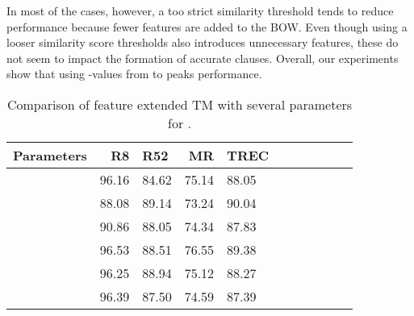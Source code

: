 \documentclass[11pt]{article}
\begin{document}
\par In most of the cases, however, a too strict similarity threshold  tends to reduce performance because fewer features are added to the BOW. Even though using a looser similarity score thresholds also introduces unnecessary features, these do not seem to impact the formation of accurate clauses. Overall, our experiments show that using -values from  to  peaks performance.



\begin{comment}

\begin{figure}[h]
    \centering
    \texttt{[image: Figures/R8CS.pdf]}
    \caption{Epoch-wise test accuracy based on various -values for R8.}
    \label{fig10}
\end{figure}

\begin{figure}[h]
    \centering
    \texttt{[image: Figures/R52CS.pdf]}
    \caption{Epoch-wise test accuracy based on various -values for R52 dataset.}
    \label{fig11}
\end{figure}

\begin{figure}[h]
    \centering
    \texttt{[image: Figures/TRECCS.pdf]}
    \caption{Epoch-wise test accuracy based on various parameter-values  for TREC.}
    \label{fig12}
\end{figure}

\begin{figure}[h]
    \centering
    \texttt{[image: Figures/MRCS.pdf]}
    \caption{Epoch-wise test accuracy based on various parameter-values  for MR.}
    \label{fig13}
\end{figure}

\end{comment}


\begin{table}
\centering
\begin{tabular}{lrlrlrlrlrl}
\hline \textbf{Parameters} & \textbf{R8} & \textbf{R52} & \textbf{MR} & \textbf{TREC} \\ \hline
 & 96.16 & 84.62 & 75.14  & 88.05 \\
 & 88.08 & 89.14 & 73.24  & 90.04 \\
 & 90.86 & 88.05 & 74.34  & 87.83 \\
 & 96.53 & 88.51 & 76.55  & 89.38 \\
 & 96.25 & 88.94 & 75.12  & 88.27 \\
 & 96.39 & 87.50 & 74.59  & 87.39 \\
\hline
\end{tabular}
\caption{\label{table66} Comparison of feature extended TM with several parameters for .}
\end{table}
\end{document}
